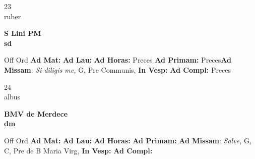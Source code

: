 \documentclass[10pt, openany]{book}
\begin{document}
    \begin{center}
        \begin{minipage}{3.5in}
            \vspace{2em}
            \begin{minipage}{0.5in}
                {\Huge 23} \\
                {\normalsize ruber}
            \end{minipage}
            \begin{minipage}{3.0in}
                \textbf{ \large S Lini PM \\
                \textnormal{\normalsize sd}}

            \end{minipage}
            \begin{justify}Off Ord
                \textbf{Ad Mat: }
                \textbf{Ad Lau: }
                \textbf{Ad Horas: }Preces
                \textbf{Ad Primam: }Preces\textbf{Ad Missam}: \textit{Si diligis me,} G, Pre Communis, 
                \textbf{In Vesp: }
                \textbf{Ad Compl: }Preces
            \end{justify}
        \end{minipage}
    \end{center}

    \begin{center}
        \begin{minipage}{3.5in}
            \vspace{2em}
            \begin{minipage}{0.5in}
                {\Huge 24} \\
                {\normalsize albus}
            \end{minipage}
            \begin{minipage}{3.0in}
                \textbf{ \large BMV de Merdece \\
                \textnormal{\normalsize dm}}

            \end{minipage}
            \begin{justify}Off Ord
                \textbf{Ad Mat: }
                \textbf{Ad Lau: }
                \textbf{Ad Horas: }
                \textbf{Ad Primam: }\textbf{Ad Missam}: \textit{Salve,} G, C, Pre de B Maria Virg, 
                \textbf{In Vesp: }
                \textbf{Ad Compl: }
            \end{justify}
        \end{minipage}
    \end{center}
\end{document}
